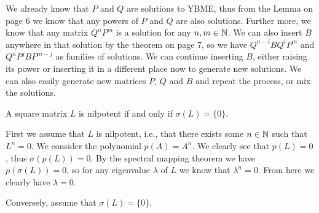\documentclass{article}
\begin{document}
\begin{solution}
  We already know that $P$ and $Q$ are solutions to YBME, thus from the Lemma on page 6 we know that any powers of $P$ and $Q$ are also solutions.
  Further more, we know that any matrix $Q^n P^m$ is a solution for any $n, m \in \mathbb{N}$.
  We can also insert $B$ anywhere in that solution by the theorem on page 7, so we have $Q^{n - i} B Q^i P^m$ and $Q^n P^j B P^{m - j}$ as families of solutions.
  We can continue inserting $B$, either raising its power or inserting it in a different place now to generate new solutions.
  We can also easily generate new matrices $P$, $Q$ and $B$ and repeat the process, or mix the solutions.
\end{solution}

\begin{problem}
  A square matrix $L$ is nilpotent if and only if $\sigma(L) = \{0\}$.
\end{problem}

\begin{solution}
  First we assume that $L$ is nilpotent, i.e., that there exists some $n \in \mathbb{N}$ such that $L^n = 0$.
  We consider the polynomial $p(A) = A^n$.
  We clearly see that $p(L) = 0$, thus $\sigma(p(L)) = 0$.
  By the spectral mapping theorem we have $p(\sigma(L)) = 0$, so for any eigenvalue $\lambda$ of $L$ we know that $\lambda^n = 0$.
  From here we clearly have $\lambda = 0$.
  
  Conversely, assume that $\sigma(L) = \{0\}$.
\end{solution}
\end{document}

